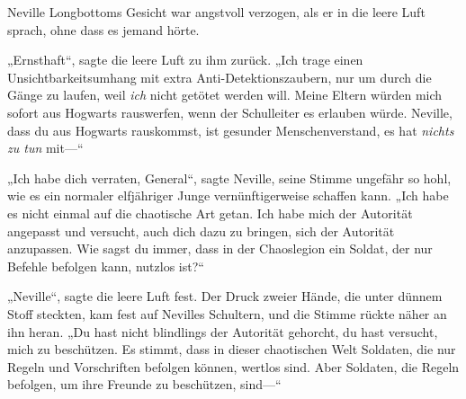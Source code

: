 Neville Longbottoms Gesicht war angstvoll verzogen, als er in die leere Luft sprach, ohne dass es jemand hörte.

„Ernsthaft“, sagte die leere Luft zu ihm zurück. „Ich trage einen Unsichtbarkeitsumhang mit extra Anti-Detektionszaubern, nur um durch die Gänge zu laufen, weil \emph{ich} nicht getötet werden will. Meine Eltern würden mich sofort aus Hogwarts rauswerfen, wenn der Schulleiter es erlauben würde. Neville, dass du aus Hogwarts rauskommst, ist gesunder Menschenverstand, es hat \emph{nichts zu tun} mit—“

„Ich habe dich verraten, General“, sagte Neville, seine Stimme ungefähr so hohl, wie es ein normaler elfjähriger Junge vernünftigerweise schaffen kann. „Ich habe es nicht einmal auf die chaotische Art getan. Ich habe mich der Autorität angepasst und versucht, auch dich dazu zu bringen, sich der Autorität anzupassen. Wie sagst du immer, dass in der Chaoslegion ein Soldat, der nur Befehle befolgen kann, nutzlos ist?“

„Neville“, sagte die leere Luft fest. Der Druck zweier Hände, die unter dünnem Stoff steckten, kam fest auf Nevilles Schultern, und die Stimme rückte näher an ihn heran. „Du hast nicht blindlings der Autorität gehorcht, du hast versucht, mich zu beschützen. Es stimmt, dass in dieser chaotischen Welt Soldaten, die nur Regeln und Vorschriften befolgen können, wertlos sind. Aber Soldaten, die Regeln befolgen, um ihre Freunde zu beschützen, sind—“


